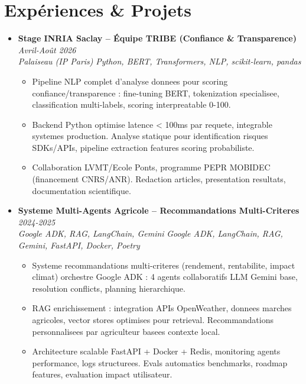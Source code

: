 \documentclass[a4paper,11pt]{article}
\begin{document}
\section{Exp\'eriences \& Projets}
\begin{itemize}[leftmargin=*, label={-}]

\item \textbf{Stage INRIA Saclay -- \'Equipe TRIBE (Confiance \& Transparence)} \hfill \textit{Avril-Ao\^ut 2026} \\
\textit{Palaiseau (IP Paris)} \hfill \textit{Python, BERT, Transformers, NLP, scikit-learn, pandas}
\vspace{-2pt}
    \begin{itemize}[leftmargin=0.4cm, nosep, label=\tiny$\bullet$]
        \item \small{Pipeline NLP complet d'analyse donnees pour scoring confiance/transparence : fine-tuning BERT, tokenization specialisee, classification multi-labels, scoring interpreatable 0-100.}
        \item \small{Backend Python optimise latence < 100ms par requete, integrable systemes production. Analyse statique pour identification risques SDKs/APIs, pipeline extraction features scoring probabiliste.}
        \item \small{Collaboration LVMT/Ecole Ponts, programme PEPR MOBIDEC (financement CNRS/ANR). Redaction articles, presentation resultats, documentation scientifique.}
    \end{itemize}
\vspace{3pt}

\item \textbf{Systeme Multi-Agents Agricole -- Recommandations Multi-Criteres} \hfill \textit{2024-2025} \\
\textit{Google ADK, RAG, LangChain, Gemini} \hfill \textit{Google ADK, LangChain, RAG, Gemini, FastAPI, Docker, Poetry}
\vspace{-2pt}
    \begin{itemize}[leftmargin=0.4cm, nosep, label=\tiny$\bullet$]
        \item \small{Systeme recommandations multi-criteres (rendement, rentabilite, impact climat) orchestre Google ADK : 4 agents collaboratifs LLM Gemini base, resolution conflicts, planning hierarchique.}
        \item \small{RAG enrichissement : integration APIs OpenWeather, donnees marches agricoles, vector stores optimises pour retrieval. Recommandations personnalisees par agriculteur basees contexte local.}
        \item \small{Architecture scalable FastAPI + Docker + Redis, monitoring agents performance, logs structurees. Evals automatics benchmarks, roadmap features, evaluation impact utilisateur.}
    \end{itemize}
\vspace{3pt}


\end{itemize}
\end{document}
